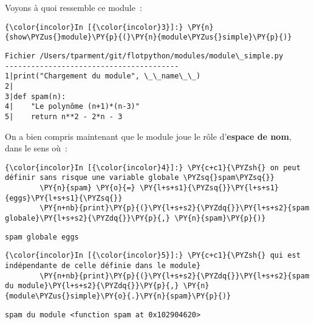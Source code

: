     Voyons à quoi ressemble ce module~:

    \begin{Verbatim}[commandchars=\\\{\}]
{\color{incolor}In [{\color{incolor}3}]:} \PY{n}{show\PYZus{}module}\PY{p}{(}\PY{n}{module\PYZus{}simple}\PY{p}{)}
\end{Verbatim}


    \begin{Verbatim}[commandchars=\\\{\}]
Fichier /Users/tparment/git/flotpython/modules/module\_simple.py
----------------------------------------
1|print("Chargement du module", \_\_name\_\_)
2|
3|def spam(n):
4|    "Le polynôme (n+1)*(n-3)"
5|    return n**2 - 2*n - 3

    \end{Verbatim}

    On a bien compris maintenant que le module joue le rôle d'\textbf{espace
de nom}, dans le sens où~:

    \begin{Verbatim}[commandchars=\\\{\}]
{\color{incolor}In [{\color{incolor}4}]:} \PY{c+c1}{\PYZsh{} on peut définir sans risque une variable globale \PYZsq{}spam\PYZsq{}}
        \PY{n}{spam} \PY{o}{=} \PY{l+s+s1}{\PYZsq{}}\PY{l+s+s1}{eggs}\PY{l+s+s1}{\PYZsq{}}
        \PY{n+nb}{print}\PY{p}{(}\PY{l+s+s2}{\PYZdq{}}\PY{l+s+s2}{spam globale}\PY{l+s+s2}{\PYZdq{}}\PY{p}{,} \PY{n}{spam}\PY{p}{)}
\end{Verbatim}


    \begin{Verbatim}[commandchars=\\\{\}]
spam globale eggs

    \end{Verbatim}

    \begin{Verbatim}[commandchars=\\\{\}]
{\color{incolor}In [{\color{incolor}5}]:} \PY{c+c1}{\PYZsh{} qui est indépendante de celle définie dans le module}
        \PY{n+nb}{print}\PY{p}{(}\PY{l+s+s2}{\PYZdq{}}\PY{l+s+s2}{spam du module}\PY{l+s+s2}{\PYZdq{}}\PY{p}{,} \PY{n}{module\PYZus{}simple}\PY{o}{.}\PY{n}{spam}\PY{p}{)}
\end{Verbatim}


    \begin{Verbatim}[commandchars=\\\{\}]
spam du module <function spam at 0x102904620>

    \end{Verbatim}

